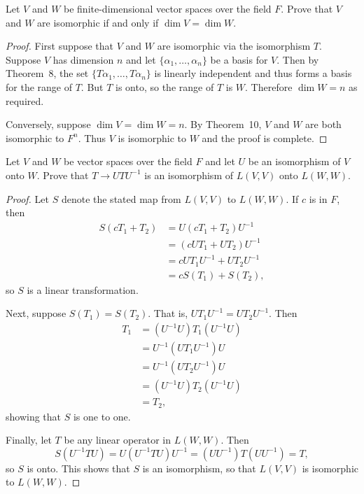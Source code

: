  Let $V$ and $W$ be finite-dimensional vector spaces over
the field $F$. Prove that $V$ and $W$ are isomorphic if and only if
$\dim V = \dim W$.
\begin{proof}
  First suppose that $V$ and $W$ are isomorphic via the isomorphism
  $T$. Suppose $V$ has dimension $n$ and let
  $\{\alpha_1,\dots,\alpha_n\}$ be a basis for $V$. Then by Theorem~8,
  the set $\{T\alpha_1,\dots,T\alpha_n\}$ is linearly independent and
  thus forms a basis for the range of $T$. But $T$ is onto, so the
  range of $T$ is $W$. Therefore $\dim W = n$ as required.

  Conversely, suppose $\dim V = \dim W = n$. By Theorem~10, $V$ and
  $W$ are both isomorphic to $F^n$. Thus $V$ is isomorphic to $W$ and
  the proof is complete.
\end{proof}

 Let $V$ and $W$ be vector spaces over the field $F$ and let
$U$ be an isomorphism of $V$ onto $W$. Prove that $T\to UTU^{-1}$ is
an isomorphism of $L(V, V)$ onto $L(W, W)$.
\begin{proof}
  Let $S$ denote the stated map from $L(V,V)$ to $L(W,W)$. If $c$ is
  in $F$, then
  \begin{align*}
    S(cT_1 + T_2)
    &= U(cT_1 + T_2)U^{-1} \\
    &= (cUT_1 + UT_2)U^{-1} \\
    &= cUT_1U^{-1} + UT_2U^{-1} \\
    &= cS(T_1) + S(T_2),
  \end{align*}
  so $S$ is a linear transformation.

  Next, suppose $S(T_1) = S(T_2)$. That is, $UT_1U^{-1} =
  UT_2U^{-1}$. Then
  \begin{align*}
    T_1 &= (U^{-1}U)T_1(U^{-1}U) \\
        &= U^{-1}(UT_1U^{-1})U \\
        &= U^{-1}(UT_2U^{-1})U \\
        &= (U^{-1}U)T_2(U^{-1}U) \\
        &= T_2,
  \end{align*}
  showing that $S$ is one to one.

  Finally, let $T$ be any linear operator in $L(W,W)$. Then
  \begin{equation*}
    S(U^{-1}TU) = U(U^{-1}TU)U^{-1} = (UU^{-1})T(UU^{-1}) = T,
  \end{equation*}
  so $S$ is onto. This shows that $S$ is an isomorphism, so that
  $L(V,V)$ is isomorphic to $L(W,W)$.
\end{proof}
